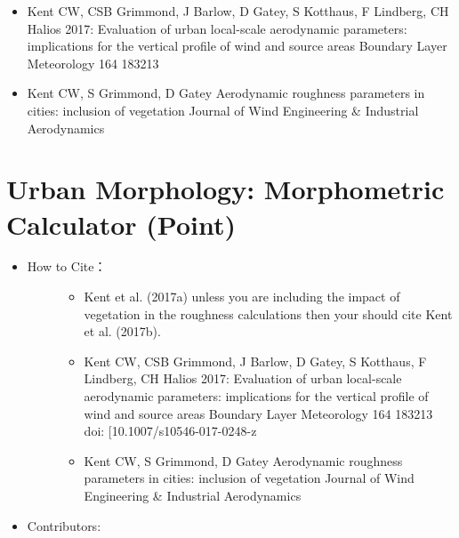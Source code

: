 \documentclass[letterpaper,10pt,english]{sphinxmanual}
\begin{document}
\begin{itemize}
\begin{description}
\begin{itemize}
\item {} 
Kent CW, CSB Grimmond, J Barlow, D Gatey, S Kotthaus, F Lindberg, CH Halios 2017: Evaluation of urban local-scale aerodynamic parameters: implications for the vertical profile of wind and source areas Boundary Layer Meteorology 164 183\textendash{}213 

\item {} 
Kent CW, S Grimmond, D Gatey Aerodynamic roughness parameters in cities: inclusion of vegetation Journal of Wind Engineering \& Industrial Aerodynamics 

\end{itemize}

\end{description}

\end{itemize}


\section{Urban Morphology: Morphometric Calculator (Point)}
\label{\detokenize{pre-processor/Urban Morphology Morphometric Calculator (Point):urban-morphology-morphometric-calculator-point}}\label{\detokenize{pre-processor/Urban Morphology Morphometric Calculator (Point):morphometriccalculator-point}}\label{\detokenize{pre-processor/Urban Morphology Morphometric Calculator (Point)::doc}}\begin{itemize}
\item {} \begin{description}
\item[{How to Cite：}] \leavevmode\begin{itemize}
\item {} 
Kent et al. (2017a) unless you are including the impact of vegetation in the roughness calculations then your should cite Kent et al. (2017b).

\item {} 
Kent CW, CSB Grimmond, J Barlow, D Gatey, S Kotthaus, F Lindberg, CH Halios 2017: Evaluation of urban local-scale aerodynamic parameters: implications for the vertical profile of wind and source areas Boundary Layer Meteorology 164 183\textendash{}213 doi: {[}10.1007/s10546-017-0248-z \sphinxurl{https://link.springer.com/article/10.1007/s10546-017-0248-z}{]}

\item {} 
Kent CW, S Grimmond, D Gatey Aerodynamic roughness parameters in cities: inclusion of vegetation Journal of Wind Engineering \& Industrial Aerodynamics 

\end{itemize}

\end{description}

\item {} 
Contributors:

\end{itemize}
\end{document}
